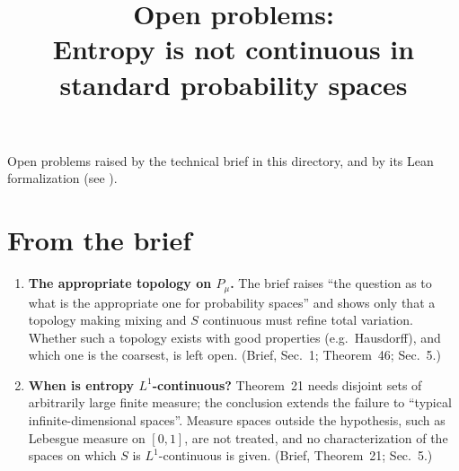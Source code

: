 \documentclass[11pt]{article}
\title{Open problems:\\ Entropy is not continuous in standard probability spaces}
\author{}
\date{}
\begin{document}
\maketitle

\noindent
Open problems raised by the technical brief in this directory, and by its Lean formalization
(see ).

\section*{From the brief}
\begin{enumerate}
\item \textbf{The appropriate topology on $P_\mu$.} The brief raises ``the question as to what is
  the appropriate one for probability spaces'' and shows only that a topology making mixing and
  $S$ continuous must refine total variation. Whether such a topology exists with good properties
  (e.g.\ Hausdorff), and which one is the coarsest, is left open. (Brief, Sec.~1; Theorem~46;
  Sec.~5.)
\item \textbf{When is entropy $L^1$-continuous?} Theorem~21 needs disjoint sets of arbitrarily
  large finite measure; the conclusion extends the failure to ``typical infinite-dimensional
  spaces''. Measure spaces outside the hypothesis, such as Lebesgue measure on $[0,1]$, are not
  treated, and no characterization of the spaces on which $S$ is $L^1$-continuous is given.
  (Brief, Theorem~21; Sec.~5.)
\end{enumerate}
\end{document}
